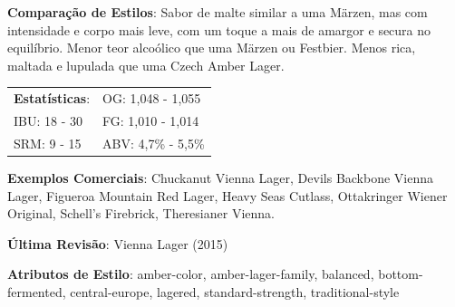 \textbf{Comparação de Estilos}: Sabor de malte similar a uma Märzen, mas com intensidade e corpo mais leve, com um toque a mais de amargor e secura no equilíbrio. Menor teor alcoólico que uma Märzen ou Festbier. Menos rica, maltada e lupulada que uma Czech Amber Lager.

\begin{tabular}{@{}p{35mm}p{35mm}@{}}
  \textbf{Estatísticas}: & OG: 1,048 - 1,055 \\
  IBU: 18 - 30 & FG: 1,010 - 1,014 \\
  SRM: 9 - 15 & ABV: 4,7\% - 5,5\%
\end{tabular}

\textbf{Exemplos Comerciais}: Chuckanut Vienna Lager, Devils Backbone Vienna Lager, Figueroa Mountain Red Lager, Heavy Seas Cutlass, Ottakringer Wiener Original, Schell’s Firebrick, Theresianer Vienna.

\textbf{Última Revisão}: Vienna Lager (2015)

\textbf{Atributos de Estilo}: amber-color, amber-lager-family, balanced, bottom-fermented, central-europe, lagered, standard-strength, traditional-style
